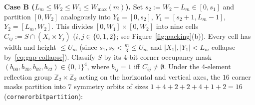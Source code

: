 \documentclass[11pt,reqno]{amsart}
\theoremstyle{plain}
\theoremstyle{definition}
\theoremstyle{remark}
\DeclareRobustCommand{\_}{\ifmmode\text{\textunderscore}\else\textunderscore\allowbreak\fi}
\begin{document}
\medskip
\noindent\textbf{Case B ($L_m \le W_2 \le W_1 \le W_{\max}(m)$).}
Set $s_2 := W_2 - L_m \in [0, s_1]$ and partition $[0, W_2]$ analogously into $Y_0 = [0, s_2]$, $Y_1 = [s_2 + 1, L_m - 1]$, $Y_2 = [L_m, W_2]$. This divides $[0, W_1] \times [0, W_2]$ into nine cells $C_{ij} := S \cap (X_i \times Y_j)$ ($i, j \in \{0, 1, 2\}$; see Figure~\ref{fig:packing}(b)). Every cell has width and height $\le U_m$ (since $s_1, s_2 < \frac{m}{3} \le U_m$ and $|X_1|, |Y_1| < L_m$ collapse by~\eqref{eq:gap-collapse}). Classify $S$ by its $4$-bit corner occupancy mask $(b_{00}, b_{20}, b_{02}, b_{22}) \in \{0, 1\}^4$, where $b_{ij} = 1$ iff $C_{ij} \neq \emptyset$. Under the $4$-element reflection group $\mathbb{Z}_2 \times \mathbb{Z}_2$ acting on the horizontal and vertical axes, the $16$ corner masks partition into $7$ symmetry orbits of sizes $1 + 4 + 2 + 2 + 4 + 1 + 2 = 16$ (\texttt{corner\_orbit\_partition\_16}):
\end{document}
